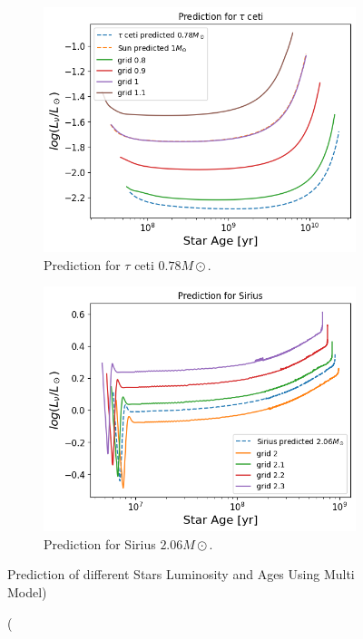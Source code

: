 \begin{figure}[H]
	\centering
	\begin{subfigure}{\textwidth}
		\centering
		\includegraphics[width=\textwidth,height=0.5\textheight]{assets/predtauceti.png}
		\caption{Prediction for $\tau$ ceti $0.78 M\odot$.}
		\label{fig:tau}	
	\end{subfigure}
	\begin{subfigure}{\textwidth}
		\includegraphics[width=\textwidth,height=0.5\textheight]{assets/predsirius.png}
		\caption{Prediction for Sirius $2.06 M\odot$.}
		\label{fig:Sirius}
	\end{subfigure}
	\caption(Prediction of different Stars Luminosity and Ages Using Multi Model)
	\label{fig:predict}
\end{figure}            
\begin{figure}[H]

\end{figure}

